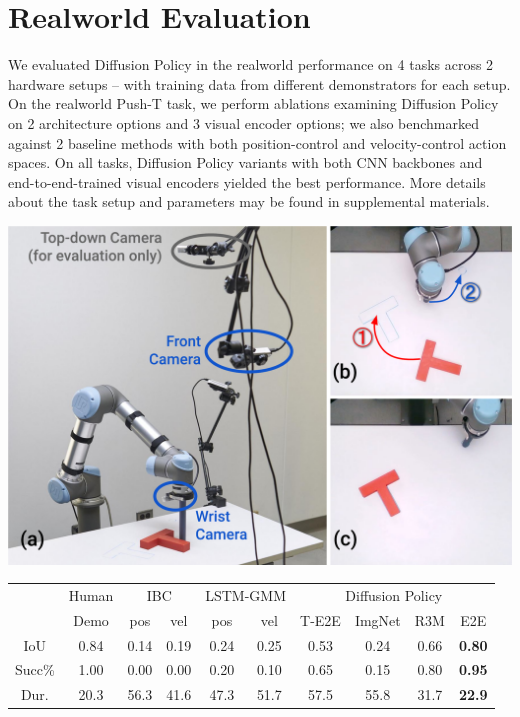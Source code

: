 \documentclass[Afour,sageh,times]{sagej}
\begin{document}
\section{Realworld Evaluation}
We evaluated Diffusion Policy in the realworld performance on 4 tasks across 2 hardware setups -- with training data from different demonstrators for each setup. On the realworld Push-T task, we perform ablations examining Diffusion Policy on 2 architecture options and 3 visual encoder options; we also benchmarked against 2 baseline methods with both position-control and velocity-control action spaces. On all tasks, Diffusion Policy variants with both CNN backbones and end-to-end-trained visual encoders yielded the best performance. More details about the task setup and parameters may be found in supplemental materials.

\begin{table}[t]
\centering
\includegraphics[width=0.9\linewidth]{figure/real_task_setup.pdf}

\vspace{2mm}
\setlength\tabcolsep{1.2pt}
\small
\begin{tabular}{c|c|cc|cc|cccc}
\toprule
       & Human & \multicolumn{2}{c|}{IBC} & \multicolumn{2}{c|}{LSTM-GMM} & \multicolumn{4}{c}{Diffusion Policy}     \\
       & Demo  & pos        & vel        & pos          & vel         & T-E2E & ImgNet & R3M & E2E         \\
\midrule
IoU      & 0.84  & 0.14       & 0.19       & 0.24         & 0.25        & 0.53  & 0.24     & 0.66  & \textbf{0.80} \\
Succ\%   & 1.00  & 0.00       & 0.00       & 0.20         & 0.10        & 0.65  & 0.15     & 0.80  & \textbf{0.95} \\
Dur. & 20.3  & 56.3       & 41.6       & 47.3         & 51.7        & 57.5  & 55.8     & 31.7  & \textbf{22.9} \\
\bottomrule
\end{tabular}


\end{table}
\end{document}
